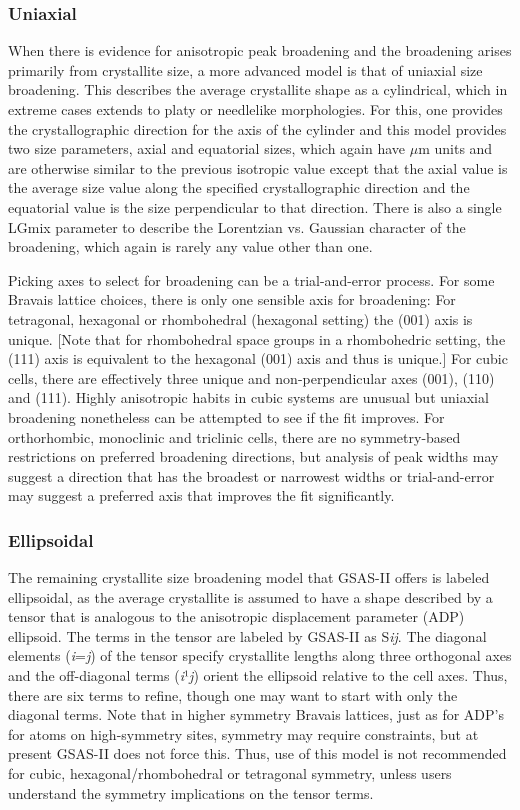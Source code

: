  \subsubsection{Uniaxial}
 When there is evidence for anisotropic peak broadening and the broadening arises primarily from crystallite size, a more advanced model is that of uniaxial size broadening. This describes the average crystallite shape as a cylindrical, which in extreme cases extends to platy or needlelike morphologies. For this, one provides the crystallographic direction for the axis of the cylinder and this model provides two size parameters, axial and equatorial sizes, which again have $\mu$m units and are otherwise similar to the previous isotropic value except that the axial value is the average size value along the specified crystallographic direction and the equatorial value is the size perpendicular to that direction. There is also a single LGmix parameter to describe the Lorentzian vs. Gaussian character of the broadening, which again is rarely any value other than one. 

 Picking axes to select for broadening can be a trial-and-error process. For some Bravais lattice choices, there is only one sensible axis for broadening: For tetragonal, hexagonal or rhombohedral (hexagonal setting) the (001) axis is unique. [Note that for rhombohedral space groups in a rhombohedric setting, the (111) axis is equivalent to the hexagonal (001) axis and thus is unique.] For cubic cells, there are effectively three unique and non-perpendicular axes (001), (110) and (111). Highly anisotropic habits in cubic systems are unusual but uniaxial broadening nonetheless can be attempted to see if the fit improves. For orthorhombic, monoclinic and triclinic cells, there are no symmetry-based restrictions on preferred broadening directions, but analysis of peak widths may suggest a direction that has the broadest or narrowest widths or trial-and-error may suggest a preferred axis that improves the fit significantly. 

 \subsubsection{Ellipsoidal}
 The remaining crystallite size broadening model that GSAS-II offers is labeled ellipsoidal, as the average crystallite is assumed to have a shape described by a tensor that is analogous to the anisotropic displacement parameter (ADP) ellipsoid. The terms in the tensor are labeled by GSAS-II as S\textit{ij}. The diagonal elements (\textit{i}=\textit{j}) of the tensor specify crystallite lengths along three orthogonal axes and the off-diagonal terms (\textit{i}¹\textit{j}) orient the ellipsoid relative to the cell axes. Thus, there are six terms to refine, though one may want to start with only the diagonal terms. Note that in higher symmetry Bravais lattices, just as for ADP’s for atoms on high-symmetry sites, symmetry may require constraints, but at present GSAS-II does not force this. Thus, use of this model is not recommended for cubic, hexagonal/rhombohedral or tetragonal symmetry, unless users understand the symmetry implications on the tensor terms.


